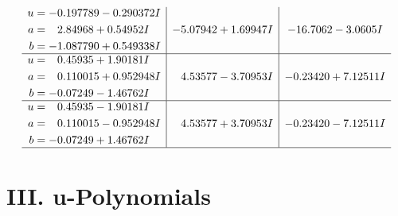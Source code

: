\documentclass[1p]{elsarticle_modified}
\theoremstyle{definition}
\begin{document}
$$\begin{array}{c|c|c}
\begin{aligned}
u &= -0.197789 - 0.290372 I \\
a &= \phantom{-}2.84968 + 0.54952 I \\
b &= -1.087790 + 0.549338 I\end{aligned}
 & -5.07942 + 1.69947 I & -16.7062 - 3.0605 I \\ \hline\begin{aligned}
u &= \phantom{-}0.45935 + 1.90181 I \\
a &= \phantom{-}0.110015 + 0.952948 I \\
b &= -0.07249 - 1.46762 I\end{aligned}
 & \phantom{-}4.53577 - 3.70953 I & -0.23420 + 7.12511 I \\ \hline\begin{aligned}
u &= \phantom{-}0.45935 - 1.90181 I \\
a &= \phantom{-}0.110015 - 0.952948 I \\
b &= -0.07249 + 1.46762 I\end{aligned}
 & \phantom{-}4.53577 + 3.70953 I & -0.23420 - 7.12511 I\\
 \hline 
 \end{array}$$\newpage
\newpage\renewcommand{\arraystretch}{1}
\centering \section*{ III. u-Polynomials}
\end{document}

